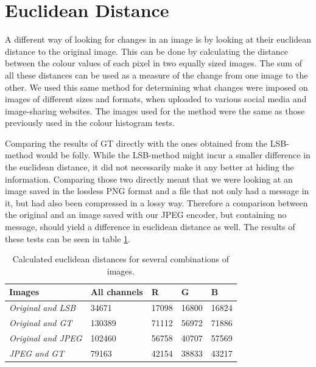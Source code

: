 \section{Euclidean Distance}
A different way of looking for changes in an image is by looking at their euclidean distance to the original image.
This can be done by calculating the distance between the colour values of each pixel in two equally sized images.
The sum of all these distances can be used as a measure of the change from one image to the other.
We used this same method for determining what changes were imposed on images of different sizes and formats, when uploaded to various social media and image-sharing websites.
The images used for the method were the same as those previously used in the colour histogram tests.

Comparing the results of GT directly with the ones obtained from the LSB-method would be folly.
While the LSB-method might incur a smaller difference in the euclidean distance, it did not necessarily make it any better at hiding the information.
Comparing those two directly meant that we were looking at an image saved in the lossless PNG format and a file that not only had a message in it, but had also been compressed in a lossy way.
Therefore a comparison between the original and an image saved with our JPEG encoder, but containing no message, should yield a difference in euclidean distance as well.
The results of these tests can be seen in table \ref {fig:euclidean_distance}.

\begin{table}[]
	\centering
	\begin{tabular}{@{}lllll@{}}
		\toprule
		\textbf{Images}            & \textbf{All channels} & \textbf{R} & \textbf{G} & \textbf{B} \\ \midrule
		\textit{Original and LSB}  & 34671                 & 17098      & 16800      & 16824      \\
		\textit{Original and GT}   & 130389                & 71112      & 56972      & 71886      \\
		\textit{Original and JPEG} & 102460                & 56758      & 40707      & 57569      \\
		\textit{JPEG and GT}       & 79163                 & 42154      & 38833      & 43217     
	\end{tabular}
	\caption{Calculated euclidean distances for several combinations of images.}
	\label{fig:euclidean_distance}
\end{table}

